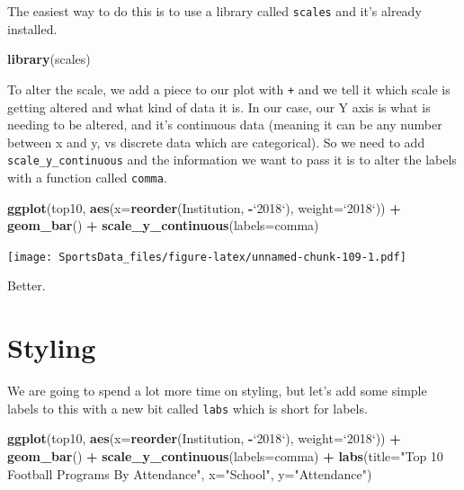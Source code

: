 \documentclass[]{book}
\newenvironment{Shaded}{\begin{snugshade}}{\end{snugshade}}
\newcommand{\DataTypeTok}[1]{\textcolor[rgb]{0.13,0.29,0.53}{#1}}
\newcommand{\KeywordTok}[1]{\textcolor[rgb]{0.13,0.29,0.53}{\textbf{#1}}}
\newcommand{\NormalTok}[1]{#1}
\newcommand{\OperatorTok}[1]{\textcolor[rgb]{0.81,0.36,0.00}{\textbf{#1}}}
\newcommand{\StringTok}[1]{\textcolor[rgb]{0.31,0.60,0.02}{#1}}
\begin{document}
The easiest way to do this is to use a library called \texttt{scales} and it's already installed.

\begin{Shaded}
\begin{Highlighting}[]
\KeywordTok{library}\NormalTok{(scales)}
\end{Highlighting}
\end{Shaded}

To alter the scale, we add a piece to our plot with \texttt{+} and we tell it which scale is getting altered and what kind of data it is. In our case, our Y axis is what is needing to be altered, and it's continuous data (meaning it can be any number between x and y, vs discrete data which are categorical). So we need to add \texttt{scale\_y\_continuous} and the information we want to pass it is to alter the labels with a function called \texttt{comma}.

\begin{Shaded}
\begin{Highlighting}[]
\KeywordTok{ggplot}\NormalTok{(top10, }\KeywordTok{aes}\NormalTok{(}\DataTypeTok{x=}\KeywordTok{reorder}\NormalTok{(Institution, }\OperatorTok{-}\StringTok{`}\DataTypeTok{2018}\StringTok{`}\NormalTok{), }\DataTypeTok{weight=}\StringTok{`}\DataTypeTok{2018}\StringTok{`}\NormalTok{)) }\OperatorTok{+}\StringTok{ }
\StringTok{  }\KeywordTok{geom_bar}\NormalTok{() }\OperatorTok{+}\StringTok{ }
\StringTok{  }\KeywordTok{scale_y_continuous}\NormalTok{(}\DataTypeTok{labels=}\NormalTok{comma)}
\end{Highlighting}
\end{Shaded}

\texttt{[image: SportsData\_files/figure-latex/unnamed-chunk-109-1.pdf]}

Better.

\hypertarget{styling}{%
\section{Styling}\label{styling}}

We are going to spend a lot more time on styling, but let's add some simple labels to this with a new bit called \texttt{labs} which is short for labels.

\begin{Shaded}
\begin{Highlighting}[]
\KeywordTok{ggplot}\NormalTok{(top10, }\KeywordTok{aes}\NormalTok{(}\DataTypeTok{x=}\KeywordTok{reorder}\NormalTok{(Institution, }\OperatorTok{-}\StringTok{`}\DataTypeTok{2018}\StringTok{`}\NormalTok{), }\DataTypeTok{weight=}\StringTok{`}\DataTypeTok{2018}\StringTok{`}\NormalTok{)) }\OperatorTok{+}\StringTok{ }
\StringTok{  }\KeywordTok{geom_bar}\NormalTok{() }\OperatorTok{+}\StringTok{ }
\StringTok{  }\KeywordTok{scale_y_continuous}\NormalTok{(}\DataTypeTok{labels=}\NormalTok{comma) }\OperatorTok{+}\StringTok{ }
\StringTok{  }\KeywordTok{labs}\NormalTok{(}\DataTypeTok{title=}\StringTok{"Top 10 Football Programs By Attendance"}\NormalTok{, }\DataTypeTok{x=}\StringTok{"School"}\NormalTok{, }\DataTypeTok{y=}\StringTok{"Attendance"}\NormalTok{)}
\end{Highlighting}
\end{Shaded}
\end{document}
